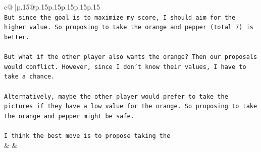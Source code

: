 \documentclass{article}
\begin{document}
{\begin{supertabular}{c@{$\;$}|p{.15\linewidth}@{}p{.15\linewidth}p{.15\linewidth}p{.15\linewidth}p{.15\linewidth}p{.15\linewidth}}
{{{\\ 
\texttt{But since the goal is to maximize my score, I should aim for the higher value. So proposing to take the orange and pepper (total 7) is better. } \\
\\ 
\texttt{But what if the other player also wants the orange? Then our proposals would conflict. However, since I don't know their values, I have to take a chance. } \\
\\ 
\texttt{Alternatively, maybe the other player would prefer to take the pictures if they have a low value for the orange. So proposing to take the orange and pepper might be safe. } \\
\\ 
\texttt{I think the best move is to propose taking the} \\
            }
        }
    }
    & & \\ \\


\end{supertabular}}
\end{document}
